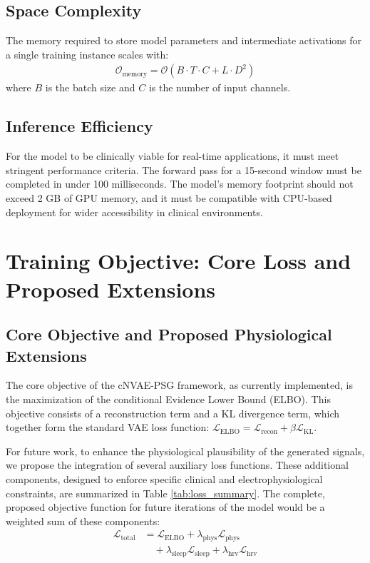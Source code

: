 \documentclass[11pt,en]{elegantpaper}
\begin{document}
\subsection{Space Complexity}
The memory required to store model parameters and intermediate activations for a single training instance scales with:
\begin{align}
\mathcal{O}_{\text{memory}} = \mathcal{O}(B \cdot T \cdot C + L \cdot D^2)
\end{align}
where $B$ is the batch size and $C$ is the number of input channels.

\subsection{Inference Efficiency}
For the model to be clinically viable for real-time applications, it must meet stringent performance criteria. The forward pass for a 15-second window must be completed in under 100 milliseconds. The model's memory footprint should not exceed 2 GB of GPU memory, and it must be compatible with CPU-based deployment for wider accessibility in clinical environments.

\section{Training Objective: Core Loss and Proposed Extensions}

\subsection{Core Objective and Proposed Physiological Extensions}

The core objective of the cNVAE-PSG framework, as currently implemented, is the maximization of the conditional Evidence Lower Bound (ELBO). This objective consists of a reconstruction term and a KL divergence term, which together form the standard VAE loss function: $\mathcal{L}_{\text{ELBO}} = \mathcal{L}_{\text{recon}} + \beta \mathcal{L}_{\text{KL}}$.

For future work, to enhance the physiological plausibility of the generated signals, we propose the integration of several auxiliary loss functions. These additional components, designed to enforce specific clinical and electrophysiological constraints, are summarized in Table \ref{tab:loss_summary}. The complete, proposed objective function for future iterations of the model would be a weighted sum of these components:
\begin{align}
\mathcal{L}_{\text{total}} &= \mathcal{L}_{\text{ELBO}} + \lambda_{\text{phys}} \mathcal{L}_{\text{phys}} \\
&\quad + \lambda_{\text{sleep}} \mathcal{L}_{\text{sleep}} + \lambda_{\text{hrv}} \mathcal{L}_{\text{hrv}}
\end{align}
\end{document}
